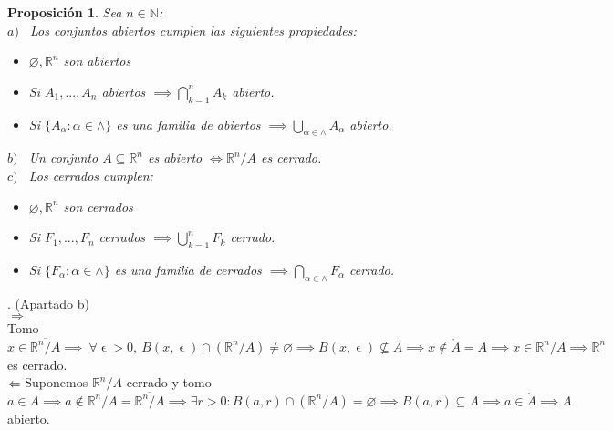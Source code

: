 \documentclass[11pt, a4paper]{article}
\makeatletter
\newif\IfInSansMode
\let\oldsf\sffamily
\renewcommand*{\sffamily}{\oldsf\mathversion{sans}\InSansModetrue}
\let\oldnorm\normalfont
\renewcommand*{\normalfont}{\oldnorm\InSansModefalse\mathversion{normal}}
\let\epsilon\upvarepsilon
\newcommand{\R}{\mathbb{R}} \newcommand{\N}{\mathbb{N}}
\renewenvironment{proof}[1][\proofname] {\par\pushQED{\qed}\normalfont\topsep6\p@\@plus6\p@\relax\trivlist\item[\hskip\labelsep\itshape\sffamily#1\@addpunct{.}]\ignorespaces}{\popQED\endtrivlist\@endpefalse}
\theoremstyle{theorem-style}
\newtheorem{nprop}{Proposición}[section]
\theoremstyle{definition-style}
\theoremstyle{remark-style}
\theoremstyle{example-style}
\makeatother
\begin{document}
\begin{nprop}
Sea $n \in \N$: \\

$a)$ \ Los conjuntos abiertos cumplen las siguientes propiedades: \\
 \begin{itemize}
 	\item $\varnothing, \R^n$ son abiertos \\
	\item Si $A_1,...,A_n$ abiertos $\implies  \displaystyle\bigcap_{k=1}^{n}{A_k}$ abierto. \\
	\item Si $\{A_{\alpha}: \alpha \in \land\} $ es una familia de abiertos $ \implies \displaystyle\bigcup_{\alpha \in \land}{A_\alpha}$ abierto. \\
 \end{itemize}
$b) $ \ Un conjunto $A \subseteq \R^n $ es abierto $ \Leftrightarrow \R^n/A$ es cerrado. \\
$c) $ \ Los cerrados cumplen: \\
 \begin{itemize} 
\item $\varnothing, \R^n$ son cerrados \\
\item Si $F_1,...,F_n$ cerrados $\implies  \displaystyle\bigcup_{k=1}^{n}{F_k}$ cerrado. \\
\item Si $\{F_{\alpha}: \alpha \in \land\} $ es una familia de cerrados $ \implies \displaystyle\bigcap_{\alpha \in \land}{F_\alpha}$ cerrado.
 \end{itemize}
\end{nprop}

\begin{proof}.
(Apartado b) \\ $\Rightarrow$ \\ Tomo $x \in \overline{\R^n/A} \implies \ \forall \epsilon > 0, \ B(x,\epsilon) \cap (\R^n/A) \ne \varnothing \implies B(x,\epsilon) \not\subseteq A \implies x \not\in \mathring{A} = A \implies x \in \R^n/A \implies \R^n$ es cerrado. \\
$\Leftarrow \\ $Suponemos $\R^n/A$ cerrado y tomo $a \in A \implies a \not\in \R^n/A = \overline{\R^n/A} \implies \exists r > 0: B(a,r) \cap (\R^n/A) = \varnothing \implies B(a,r) \subseteq A \implies a \in \mathring{A} \implies A $ abierto.
\end{proof}
\end{document}
